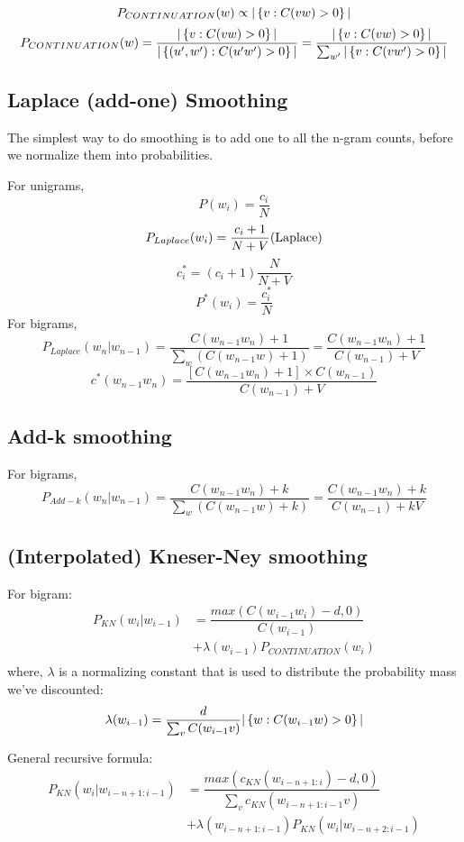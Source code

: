 \[
    P_{CONTINUATION}(w) \propto |\left\{v : C(vw) > 0\right\}|
\]
\[
    P_{CONTINUATION}(w) = \displaystyle\dfrac{|\left\{v : C(vw) > 0\right\}|}{|\left\{(u',w') : C(u'w') > 0\right\}| } = \displaystyle\dfrac{|\left\{v : C(vw) > 0\right\}|}{\sum_{w'} |\left\{v : C(vw') > 0\right\}|}
\]

\subsection{Laplace (add-one) Smoothing \cite{nlp-1}}
The simplest way to do smoothing is to add one to all the n-gram counts, before we normalize them into probabilities.

For unigrams,
\[
    P(w_i) = \displaystyle\dfrac{c_i}{N}
\]
\[
    P_{Laplace}(w_i) = \displaystyle\dfrac{c_i + 1}{N + V} \hfill \text{(Laplace)}
\]
\[
    c_i^* = (c_i +1)\displaystyle\dfrac{N}{N + V}
\]
\[
    P^*(w_i) = \displaystyle\dfrac{c_i^*}{N}
\]
For bigrams,
\[
    P_{Laplace}(w_n|w_{n-1}) = \displaystyle\dfrac{C(w_{n-1}w_n) + 1}{\sum_w (C(w_{n-1}w) + 1)} = \displaystyle\dfrac{C(w_{n-1}w_n) + 1}{C(w_{n-1}) + V} 
\]
\[
    c^*(w_{n-1}w_n) = \displaystyle\dfrac{[C(w_{n-1}w_n)+1] \times C(w_{n-1})}{C(w_{n-1}) + V} 
\]

\subsection{Add-k smoothing \cite{nlp-1}}

For bigrams,
\[
    P_{Add-k}(w_n|w_{n-1}) = \displaystyle\dfrac{C(w_{n-1}w_n) + k}{\sum_w (C(w_{n-1}w) + k)} = \displaystyle\dfrac{C(w_{n-1}w_n) + k}{C(w_{n-1}) + kV} 
\]

\subsection{(Interpolated) Kneser-Ney smoothing}

For bigram:
\begin{align*}
    P_{KN}(w_i|w_{i-1})  &= \displaystyle\dfrac{max(C(w_{i-1}w_i)-d,0)}{C(w_{i-1})} \\ 
    &+ \lambda (w_{i-1})P_{CONTINUATION}(w_i) \\ 
\end{align*}
where, $\lambda$ is a normalizing constant that is used to distribute the probability mass we’ve discounted:
\[
    \lambda(w_{i-1}) = \displaystyle\dfrac{d}{\sum_v C(w_{i-1}v)} |\left\{w : C(w_{i-1}w) > 0\right\}|
\]

General recursive formula:
\begin{align*}
    P_{KN}(w_i|w_{i-n+1:i-1})  &= \displaystyle\dfrac{max(c_{KN}(w_{i-n+1:i})-d,0)}{\sum_v c_{KN}(w_{i-n+1:i-1} v)} \\ 
    &+ \lambda (w_{i-n+1:i-1})P_{KN}(w_i|w_{i-n+2:i-1}) 
\end{align*}

